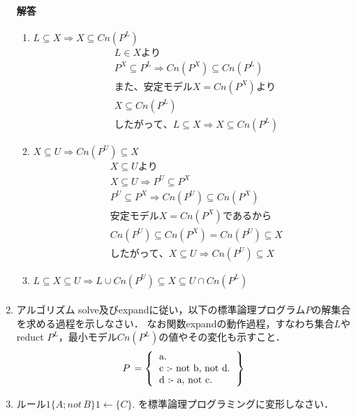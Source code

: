 \documentclass[dvipdfmx]{jsarticle}
\begin{document}
\begin{enumerate}
\paragraph{解答}
\begin{enumerate}
  \item $L\subseteq X \Rightarrow X\subseteq Cn(P^L)$
  \begin{align*}
    &L \in Xより\\
    &P^{X} \subseteq P^{L} \Rightarrow Cn(P^{X}) \subseteq Cn(P^{L})\\
    &また、安定モデルX = Cn(P^{X})より\\
    & X \subseteq Cn(P^{L})\\
    &したがって、L\subseteq X\Rightarrow X\subseteq Cn(P^L)
  \end{align*}
  \item $X\subseteq U \Rightarrow Cn(P^U)\subseteq X$
  \begin{align*}
    & X \subseteq Uより\\
    & X \subseteq U \Rightarrow P^{U} \subseteq P^{X} \\
    &P^{U} \subseteq P^{X} \Rightarrow Cn(P^{U}) \subseteq Cn(P^{X}) \\
    &安定モデルX = Cn(P^{X})であるから\\
    &Cn(P^{U}) \subseteq Cn(P^{X}) = Cn(P^{U}) \subseteq X\\
    &したがって、X\subseteq U \Rightarrow Cn(P^U)\subseteq X
  \end{align*}
  \item $L\subseteq X\subseteq U \Rightarrow  L\cup Cn(P^U)\subseteq X\subseteq U\cap Cn(P^L)$
  \begin{align*}
  \end{align*}
  \end{enumerate}



\item アルゴリズム solve及びexpandに従い，以下の標準論理プログラム$P$の解集合を求める過程を示しなさい．
  なお関数expandの動作過程，すなわち集合$L$やreduct $P^L$，最小モデル$Cn(P^L)$の値やその変化も示すこと．
  \[
  P\,=\left\{
  \begin{tabular}{l}
    a.\\
    c :- not b, not d.\\
    d :- a, not c.\\
  \end{tabular}
  \right\}
  \]

\item ルール$1\{A ; not\,B\}1\leftarrow \{ C \}.$ を標準論理プログラミングに変形しなさい．

\end{enumerate}
\end{document}
